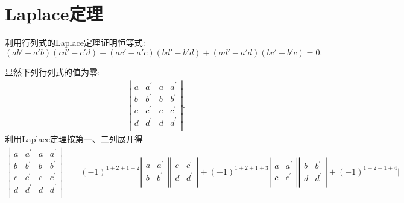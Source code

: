\documentclass[../../main.tex]{subfiles}%
\begin{document}
\section{Laplace定理}

\begin{example}
利用行列式的Laplace定理证明恒等式:
\[
(ab' - a'b)(cd' - c'd)-(ac' - a'c)(bd' - b'd)+(ad' - a'd)(bc' - b'c)=0.
\]
\end{example}
\begin{solution}

显然下列行列式的值为零:
\begin{align*}
\left| \begin{matrix}
a&		a^{\prime}&		a&		a^{\prime}\\
b&		b^{\prime}&		b&		b^{\prime}\\
c&		c^{\prime}&		c&		c^{\prime}\\
d&		d^{\prime}&		d&		d^{\prime}\\
\end{matrix} \right|.
\end{align*}
利用Laplace定理按第一、二列展开得
\begin{align*}
\left| \begin{matrix}
a&		a^{\prime}&		a&		a^{\prime}\\
b&		b^{\prime}&		b&		b^{\prime}\\
c&		c^{\prime}&		c&		c^{\prime}\\
d&		d^{\prime}&		d&		d^{\prime}\\
\end{matrix} \right|&=\left( -1 \right) ^{1+2+1+2}\left| \begin{matrix}
a&		a^{\prime}\\
b&		b^{\prime}\\
\end{matrix} \right|\left| \begin{matrix}
c&		c^{\prime}\\
d&		d^{\prime}\\
\end{matrix} \right|+\left( -1 \right) ^{1+2+1+3}\left| \begin{matrix}
a&		a^{\prime}\\
c&		c^{\prime}\\
\end{matrix} \right|\left| \begin{matrix}
b&		b^{\prime}\\
d&		d^{\prime}\\
\end{matrix} \right|+\left( -1 \right) ^{1+2+1+4}\left| \begin{matrix}

\end{matrix}
\end{align*}
\end{solution}
\end{document}
